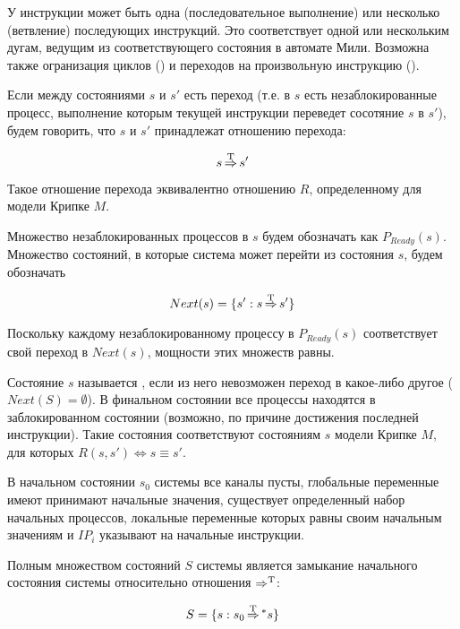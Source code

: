 У инструкции может быть одна (последовательное выполнение) или несколько (ветвление)
последующих инструкций. Это соответствует одной или нескольким дугам, ведущим из
соответствующего состояния в автомате Мили. Возможна также огранизация циклов ()
и переходов на произвольную инструкцию ().

Если между состояниями $s$ и $s'$ есть переход (т.е. в $s$ есть незаблокированные процесс,
выполнение которым текущей инструкции переведет сосотяние $s$ в $s'$), будем говорить, что
$s$ и $s'$ принадлежат отношению перехода:

\begin{equation}
  \label{eq:statetrans-def}
  s \operatorname{\operatorname*{\Rightarrow}^T} s'
\end{equation}

Такое отношение перехода эквивалентно отношению $R$, определенному для модели Крипке $M$.

Множество незаблокированных процессов в $s$ будем обозначать как $P_{Ready}(s)$.
Множество состояний, в которые система может перейти из состояния $s$, будем обозначать

\begin{equation}
  \label{eq:next-def}
  Next(s) = \{ s': s \operatorname{\operatorname*{\Rightarrow}^T} s' \}
\end{equation}

Поскольку каждому незаблокированному процессу в $P_{Ready}(s)$ соответствует свой переход
в $Next(s)$, мощности этих множеств равны.

Состояние $s$ называется , если из него невозможен переход в какое-либо
другое ($Next(S) = \emptyset$). В финальном состоянии все процессы находятся в
заблокированном состоянии (возможно, по причине достижения последней инструкции). Такие
состояния соответствуют состояниям $s$ модели Крипке $M$, для которых $R(s, s')
\Leftrightarrow s \equiv s'$.

В начальном состоянии $s_0$ системы все каналы пусты, глобальные переменные имеют
принимают начальные значения, существует определенный набор начальных процессов, локальные
переменные которых равны своим начальным значениям и $IP_i$ указывают на начальные
инструкции.

Полным множеством состояний $S$ системы является замыкание начального
состояния системы относительно отношения $\operatorname{\operatorname*{\Rightarrow}^T}$:

\begin{equation}
  \label{eq:statespace-def}
  S = \{s: s_0 \operatorname{\operatorname*{\Rightarrow}^T} \mbox{}^* s\}
\end{equation}

